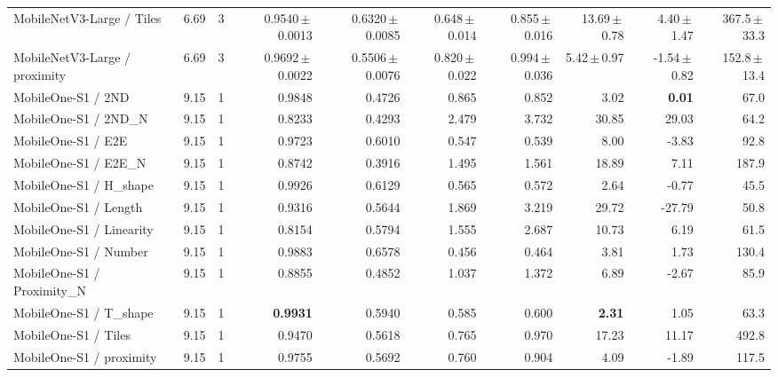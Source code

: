 \begin{table}[t]
\begin{tabular}{l r r r r r r r r r}
MobileNetV3-Large / Tiles & 6.69 & 3 & 0.9540\,$\pm$\,0.0013 & 0.6320\,$\pm$\,0.0085 & 0.648\,$\pm$\,0.014 & 0.855\,$\pm$\,0.016 & 13.69\,$\pm$\,0.78 & 4.40\,$\pm$\,1.47 & 367.5\,$\pm$\,33.3 \\
MobileNetV3-Large / proximity & 6.69 & 3 & 0.9692\,$\pm$\,0.0022 & 0.5506\,$\pm$\,0.0076 & 0.820\,$\pm$\,0.022 & 0.994\,$\pm$\,0.036 & 5.42\,$\pm$\,0.97 & -1.54\,$\pm$\,0.82 & 152.8\,$\pm$\,13.4 \\
MobileOne-S1 / 2ND & 9.15 & 1 & 0.9848 & 0.4726 & 0.865 & 0.852 & 3.02 & \textbf{0.01} & 67.0 \\
MobileOne-S1 / 2ND_N & 9.15 & 1 & 0.8233 & 0.4293 & 2.479 & 3.732 & 30.85 & 29.03 & 64.2 \\
MobileOne-S1 / E2E & 9.15 & 1 & 0.9723 & 0.6010 & 0.547 & 0.539 & 8.00 & -3.83 & 92.8 \\
MobileOne-S1 / E2E_N & 9.15 & 1 & 0.8742 & 0.3916 & 1.495 & 1.561 & 18.89 & 7.11 & 187.9 \\
MobileOne-S1 / H_shape & 9.15 & 1 & 0.9926 & 0.6129 & 0.565 & 0.572 & 2.64 & -0.77 & 45.5 \\
MobileOne-S1 / Length & 9.15 & 1 & 0.9316 & 0.5644 & 1.869 & 3.219 & 29.72 & -27.79 & 50.8 \\
MobileOne-S1 / Linearity & 9.15 & 1 & 0.8154 & 0.5794 & 1.555 & 2.687 & 10.73 & 6.19 & 61.5 \\
MobileOne-S1 / Number & 9.15 & 1 & 0.9883 & 0.6578 & 0.456 & 0.464 & 3.81 & 1.73 & 130.4 \\
MobileOne-S1 / Proximity_N & 9.15 & 1 & 0.8855 & 0.4852 & 1.037 & 1.372 & 6.89 & -2.67 & 85.9 \\
MobileOne-S1 / T_shape & 9.15 & 1 & \textbf{0.9931} & 0.5940 & 0.585 & 0.600 & \textbf{2.31} & 1.05 & 63.3 \\
MobileOne-S1 / Tiles & 9.15 & 1 & 0.9470 & 0.5618 & 0.765 & 0.970 & 17.23 & 11.17 & 492.8 \\
MobileOne-S1 / proximity & 9.15 & 1 & 0.9755 & 0.5692 & 0.760 & 0.904 & 4.09 & -1.89 & 117.5 \\
\bottomrule
\end{tabular}
\end{table}
